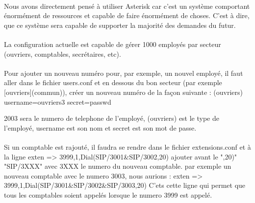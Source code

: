 \documentclass[a4paper,12pt]{article}
\begin{document}
	\paragraph{} Nous avons directement pensé à utiliser Asterisk car c'est un système comportant énormément de ressources et capable de faire énormément de choses. C'est à dire, que ce système sera capable de supporter la majorité des demandes du futur.
	\paragraph{} La configuration actuelle est capable de gérer 1000 employés par secteur (ouvriers, comptables, secrétaires, etc). 
	\paragraph{} Pour ajouter un nouveau numéro pour, par exemple, un nouvel employé, il faut aller dans le fichier users.conf et en dessous du bon secteur (par exemple [ouvriers](commun)), créer un nouveau numéro de la façon suivante : \newline \newline
	[2003](ouvriers)\newline
	username=ouvriers3\newline
	secret=passwd\newline
	
	2003 sera le numero de telephone de l'employé, (ouvriers) est le type de l'employé, username est son nom et secret est son mot de passe.
	\paragraph{} Si un comptable est rajouté, il faudra se rendre dans le fichier extensions.conf et à la ligne \newline \newline exten => 3999,1,Dial(SIP/3001\&SIP/3002,20) \newline \newline ajouter avant le ",20)" "SIP/3XXX" avec 3XXX le numero du nouveau comptable. par exemple un nouveau comptable avec le numero 3003, nous aurions : \newline \newline exten => 3999,1,Dial(SIP/3001\&SIP/3002\&SIP/3003,20) \newline \newline C'ets cette ligne qui permet que tous les comptables soient appelés lorsque le numero 3999 est appelé.
		
\end{document}
